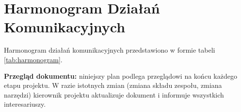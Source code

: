 \documentclass[11pt,a4paper]{article}
\begin{document}
\section{Harmonogram Działań Komunikacyjnych}
Harmonogram działań komunikacyjnych przedstawiono w formie tabeli \ref{tab:harmonogram}.



\vspace{1em}
\noindent\textbf{Przegląd dokumentu:} niniejszy plan podlega przeglądowi na końcu każdego etapu projektu. W razie istotnych zmian (zmiana składu zespołu, zmiana narzędzi) kierownik projektu aktualizuje dokument i informuje wszystkich interesariuszy.


\vspace*{\fill}
\clearpage
\end{document}
